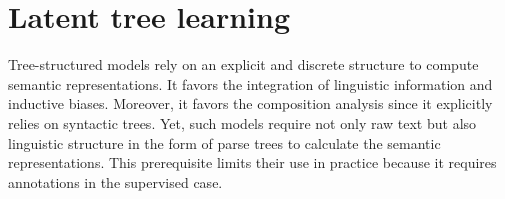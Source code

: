 


\section{Latent tree learning}

Tree-structured models rely on an explicit and discrete structure to compute semantic representations. It favors the integration of linguistic information and inductive biases. Moreover, it favors the composition analysis since it explicitly relies on syntactic trees. Yet, such models require not only raw text but also linguistic structure in the form of parse trees to calculate the semantic representations. This prerequisite limits their use in practice because it requires annotations in the supervised case. 

